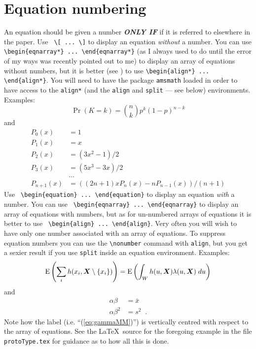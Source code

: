\documentclass[times, doublespace]{anzsauth}
\newcommand{\E}{\mbox{$\textrm{\textup{E}}$}}
\newcommand{\bX}{\mbox{$\boldsymbol{X}$}}
\begin{document}
\section{Equation numbering}
\label{sec:eqnNumb}
An equation should be given a number \textbf{\textit{ONLY IF}}
if it is referred to elsewhere in the paper.
Use \verb! \[ ... \]! to display an equation \emph{without} a number.
You can use \verb!\begin{eqnarray*} ... \end{eqnarray*}! (as I always
used to do until the error of my ways was recently pointed out to me) to
display an array of equations without numbers, but it is better (see
\cite{Madsen2006}) to use \verb!\begin{align*} ... \end{align*}!.
You will need to have the package \texttt{amsmath} loaded in order
to have access to the \texttt{align*} (and the \texttt{align}
and \texttt{split} --- see below) environments.  Examples:
\[
\Pr(K = k) = \binom{n}{k} p^k (1-p)^{n-k}
\]
and
\begin{align*}
P_0(x) &= 1 \\
P_1(x) &= x \\
P_2(x) &= (3x^2 - 1)/2 \\
P_3(x) &= (5x^3 - 3x)/2 \\
       & \ldots \\
P_{n+1}(x) &= ((2n+1)xP_n(x) - nP_{n-1}(x))/(n+1)
\end{align*}
Use \verb! \begin{equation} ... \end{equation}! to display an
equation \emph{with} a number.  You can use
\verb! \begin{eqnarray} ... \end{eqnarray}! to display an array of
equations with numbers, but as for un-numbered arrays of equations it
is better to use \verb! \begin{align} ... \end{align}!.  Very often
you will wish to have only one number associated with an array of
equations.  To suppress equation numbers you can use the
\verb!\nonumber! command with \texttt{align}, but you get a sexier
result if you use \texttt{split} inside an equation environment.
Examples:
\begin{equation}
\E \left (\sum_i h(x_i,\bX \setminus \{x_i\}) \right )
= \E \left ( \int_W h(u,\bX) \lambda(u,\bX) \; du \right )
\label{eq:GNZ}
\end{equation}
and
\begin{equation}
\begin{split}
\alpha \beta &= \bar{x} \\
\alpha \beta^2 &= s^2 \;\; .
\end{split}
\label{eq:gammaMM}
\end{equation}
Note how the label (i.e. ``(\ref{eq:gammaMM})'') is vertically
centred with respect to the array of equations.  See the \LaTeX\
source for the foregoing example in the file \texttt{protoType.tex}
for guidance as to how all this is done.
\end{document}
